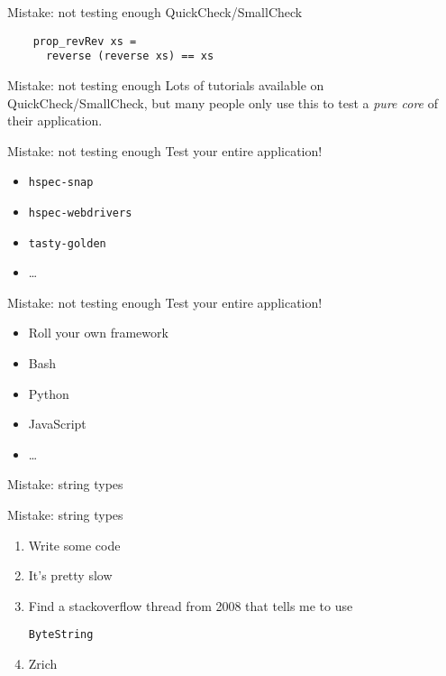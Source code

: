 \documentclass[20pt]{beamer}
\newcommand{\vspaced}{
    \vspace{5mm}
}
\newcommand{\chapterslide}[1]{
    {
        \begin{frame}[plain]
        \begin{center}
        \large{#1}
        \end{center}
        \end{frame}
    }
}
\newcommand{\code}[1]{
    \texttt{\small{#1}}
}
\begin{document}
\begin{frame}[fragile]{Mistake: not testing enough}
    QuickCheck/SmallCheck \\
    \vspaced
    \begin{lstlisting}
    prop_revRev xs =
      reverse (reverse xs) == xs
    \end{lstlisting}
\end{frame}

\begin{frame}{Mistake: not testing enough}
    Lots of tutorials available on QuickCheck/SmallCheck, but many people only
    use this to test a \emph{pure core} of their application.
\end{frame}

\begin{frame}{Mistake: not testing enough}
    Test your entire application! \\
    \vspaced
    \begin{itemize}
    \item \code{hspec-snap}
    \item \code{hspec-webdrivers}
    \item \code{tasty-golden}
    \item \ldots
    \end{itemize}
\end{frame}

\begin{frame}{Mistake: not testing enough}
    Test your entire application! \\
    \vspaced
    \begin{itemize}
    \item Roll your own framework
    \item Bash
    \item Python
    \item JavaScript
    \item \ldots
    \end{itemize}
\end{frame}


\chapterslide{Mistake: string types}

\begin{frame}{Mistake: string types}
    \begin{enumerate}
    \item Write some code
    \item It's pretty slow
    \item Find a stackoverflow thread from 2008 that tells me to use
        \code{ByteString}
    \item Zrich
    \end{enumerate}
\end{frame}
\end{document}

